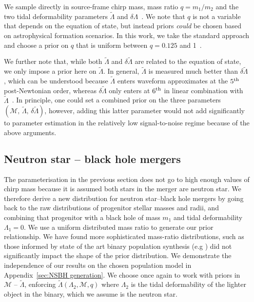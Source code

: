 \documentclass[twocolumn]{aastex631}
\begin{document}
	We sample directly in source-frame chirp mass, mass ratio $q=m_1/m_2$ and the two tidal deformability parameters $\tilde{\Lambda}$ and $\delta\Lambda$~\citep[see][for explicit expressions for these quantities]{favata14,wade14}. We note that $q$ is not a variable that depends on the equation of state, but instead priors \textit{could} be chosen based on astrophysical formation scenarios. In this work, we take the standard approach and choose a prior on $q$ that is uniform between $q=0.125$ and 1~\citep[e.g.,][]{romeroshaw20}.
	
	We further note that, while both $\tilde{\Lambda}$ and $\delta\tilde{\Lambda}$ are related to the equation of state, we only impose a prior here on $\tilde{\Lambda}$. In general, $\tilde{\Lambda}$ is measured much better than $\delta\tilde{\Lambda}$, which can be understood because $\tilde{\Lambda}$ enters waveform approximates at the $5^{\rm th}$ post-Newtonian order, whereas $\delta\tilde{\Lambda}$ only enters at $6^{\rm th}$ in linear combination with $\tilde{\Lambda}$~\citep{wade14}. In principle, one could set a combined prior on the three parameters $(\mathcal{M},\,\tilde{\Lambda},\,\delta\tilde{\Lambda})$, however, adding this latter parameter would not add significantly to parameter estimation in the relatively low signal-to-noise regime because of the above arguments.
	
	
	\subsection{Neutron star -- black hole mergers}
	The parameterisation in the previous section does not go to high enough values of chirp mass because it is assumed both stars in the merger are neutron star. We therefore derive a new distribution for neutron star--black hole mergers by going back to the raw distributions of progenitor stellar masses and radii, and combining that progenitor with a black hole of mass $m_1$ and tidal deformability $\Lambda_1=0$.
	We use a uniform  distributed mass ratio to generate our prior relationship. We have found more sophisticated mass-ratio distributions, such as those informed by state of the art binary population synthesis (e.g \citealt{2021Broekgaarden+}) did not significantly impact the shape of the prior distribution. We demonstrate the independence of our results on the chosen population model in Appendix~\ref{sec:NSBH generation}. 
	We choose once again to work with priors in $\mathcal{M}$ -- $\tilde{\Lambda}$, enforcing $\tilde{\Lambda}(\Lambda_2,\mathcal{M},q)$ where $\Lambda_2$ is the tidal deformability of the lighter object in the binary, which we assume is the neutron star.
\end{document}
